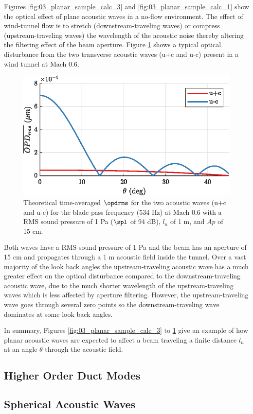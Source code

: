 Figures \ref{fig:03_planar_sample_calc_3} and \ref{fig:03_planar_sample_calc_1} show the optical effect of plane acoustic waves in a no-flow environment.
The effect of wind-tunnel flow is to stretch (downstream-traveling waves) or compress (upstream-traveling waves) the wavelength of the acoustic noise thereby altering the filtering effect of the beam aperture.
Figure \ref{fig:03_planar_sample_calc_2} shows a typical optical disturbance from the two transverse acoustic waves (u+c and u-c) present in a wind tunnel at Mach 0.6.
\begin{figure}
  \centering
  \includegraphics{../matlab/03_aero_optics_acoustics/planar_sample_calc_2.eps}
  \caption{Theoretical time-averaged $\opdrms$ for the two acoustic waves (u+c and u-c) for the blade pass frequency (534 Hz) at Mach 0.6 with a RMS sound pressure of 1 Pa ($\spl$ of 94 dB), $l_n$ of 1 m, and $Ap$ of 15 cm.}
  \label{fig:03_planar_sample_calc_2}
\end{figure}
Both waves have a RMS sound pressure of 1 Pa and the beam has an aperture of 15 cm and propagates through a 1 m acoustic field inside the tunnel.
Over a vast majority of the look back angles the upstream-traveling acoustic wave has a much greater effect on the optical disturbance compared to the downstream-traveling acoustic wave, due to the much shorter wavelength of the upstream-traveling waves which is less affected by aperture filtering.
However, the upstream-traveling wave goes through several zero points so the downstream-traveling wave dominates at some look back angles.

In summary, Figures \ref{fig:03_planar_sample_calc_3} to \ref{fig:03_planar_sample_calc_2} give an example of how planar acoustic waves are expected to affect a beam traveling a finite distance $l_n$ at an angle $\theta$ through the acoustic field.

\subsection{Higher Order Duct Modes}

\subsection{Spherical Acoustic Waves}

